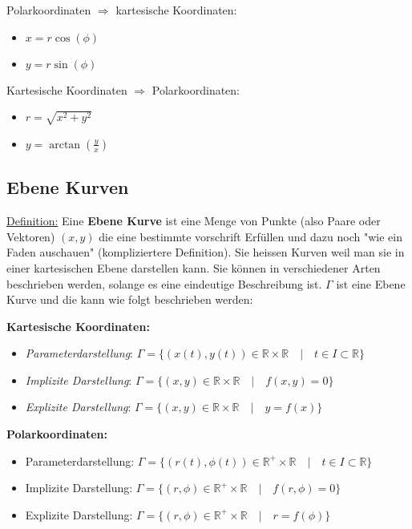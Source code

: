 \documentclass[11pt]{article} %
\begin{document}
Polarkoordinaten $\Rightarrow$ kartesische Koordinaten:
\begin{itemize}
\item $x = r\cos(\phi)$
\item $y = r\sin(\phi)$
\end{itemize}

Kartesische Koordinaten $\Rightarrow$ Polarkoordinaten: 
\begin{itemize}
\item $r = \sqrt{x^2 + y^2}$
\item $y = \arctan(\frac{y}{x})$
\end{itemize}


\subsection{Ebene Kurven}
\underline{Definition:} Eine {\bf Ebene Kurve} ist eine Menge von Punkte (also Paare oder Vektoren) $(x,y)$ die eine bestimmte vorschrift Erfüllen und dazu noch "wie ein Faden auschauen" (kompliziertere Definition). Sie heissen Kurven weil man sie in einer kartesischen Ebene darstellen kann. Sie können in verschiedener Arten beschrieben werden, solange es eine eindeutige Beschreibung ist. $\Gamma$ ist eine Ebene Kurve und die kann wie folgt beschrieben werden:

{\bf Kartesische Koordinaten:}
\begin{itemize}
\item \emph{Parameterdarstellung}: $\Gamma = \{(x(t),y(t)) \in \mathbb{R} \times \mathbb{R}\quad | \quad t \in I \subset \mathbb{R} \}$
\item \emph{Implizite Darstellung}: $\Gamma = \{(x,y) \in \mathbb{R} \times \mathbb{R}\quad | \quad f(x,y)=0 \}$
\item \emph{Explizite Darstellung}: $\Gamma = \{(x,y) \in \mathbb{R} \times \mathbb{R}\quad | \quad y = f(x) \}$
\end{itemize} 

{\bf Polarkoordinaten:}
\begin{itemize}
\item Parameterdarstellung: $\Gamma = \{(r(t),\phi(t)) \in \mathbb{R^+} \times \mathbb{R} \quad | \quad t \in I \subset \mathbb{R} \}$
\item Implizite Darstellung: $\Gamma = \{(r,\phi) \in \mathbb{R^+}\times \mathbb{R} \quad | \quad f(r,\phi)=0 \}$
\item Explizite Darstellung: $\Gamma = \{(r,\phi) \in \mathbb{R^+}\times \mathbb{R} \quad | \quad r = f(\phi) \}$
\end{itemize}
\end{document}
